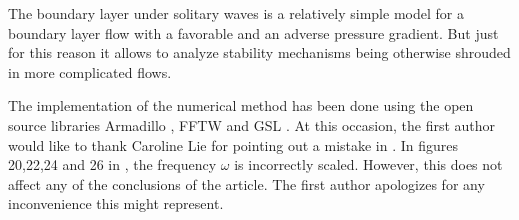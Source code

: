 \documentclass{jfm}
\begin{document}
The boundary layer under solitary waves is a relatively simple
model for a boundary layer flow with a favorable and an adverse pressure gradient. But just for this reason it allows to analyze stability mechanisms being
otherwise shrouded in more complicated flows. 


The implementation of the numerical method has been done 
using the open source libraries Armadillo \citep{armadillo},
FFTW \citep{fftw} and GSL \citep{gsl}. At this occasion, the
first author would like to thank Caroline Lie for pointing
out a mistake in \citet{VerschaevePedersen2014}. In figures
20,22,24 and 26 in \citet{VerschaevePedersen2014}, the frequency
$ \omega $ is incorrectly scaled. However, this
does not affect any of the conclusions of the article. The
first author apologizes for any inconvenience this might represent.
\end{document}
